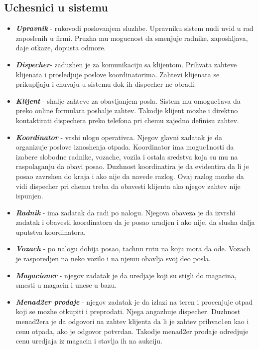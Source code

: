 \documentclass[10 pt]{article}
\begin{document}
	\subsection{Uchesnici u sistemu}
	
	\begin{itemize}
		
		\item\textbf{\textit{Upravnik}} - rukovodi poslovanjem sluzhbe. Upravniku sistem nudi uvid u rad zaposlenih u firmi. Pruzha mu mogucnost da smenjuje radnike, zaposhljava, daje otkaze, dopusta odmore.
		
		\item\textbf{\textit{Dispecher}}- zaduzhen je za komunikaciju sa klijentom. Prihvata zahteve klijenata i prosledjuje poslove koordinatorima. Zahtevi klijenata se prikupljaju i chuvaju u sistemu dok ih dispecher ne obradi.
		
		\item\textbf{\textit{Klijent}} - shalje zahteve za obavljanjem posla. Sistem mu omoguc1ava da preko online formulara poshalje zahtev. Takodje klijent mozhe i direktno kontaktirati dispechera preko telefona pri chemu zajedno definisu zahtev. 
		
		\item\textbf{\textit{Koordinator}} - vrshi ulogu operativca. Njegov glavni zadatak je da organizuje poslove iznoshenja otpada. Koordinator ima moguc1nosti da izabere slobodne radnike, vozache, vozila i ostala sredstva koja su mu na raspolaganju da obavi posao. Duzhnost koordinatira je da evidentira da li je posao zavrshen do kraja i ako nije da navede razlog. Ovaj razlog mozhe da vidi dispecher pri chemu treba da obavesti klijenta ako njegov zahtev nije ispunjen.
		
		\item\textbf{\textit{Radnik}} - ima zadatak da radi po nalogu. Njegova obaveza je da izvrshi zadatak i obavesti koordinatora da je posao uradjen i ako nije, da slusha dalja uputstva koordinatora.
		
		\item\textbf{\textit{Vozach}} - po nalogu dobija posao, tachnu rutu na koju mora da ode. Vozach je rasporedjen na neko vozilo i na njemu obavlja svoj deo posla.
		
		\item\textbf{\textit{Magacioner}} - njegov zadatak je da uredjaje koji su stigli do magacina, smesti u magacin i unese u bazu.
		
		\item\textbf{\textit{Menad2er prodaje}} - njegov zadatak je da izlazi na teren i procenjuje otpad koji se mozhe otkupiti i preprodati.
		Njega angazhuje dispecher. Duzhnost menad2era je da odgovori na zahtev klijenta da li je zahtev prihvac1en kao i cenu otpada, ako je odgovor potvrdan. Takodje menad2er prodaje odredjuje cenu uredjaja iz magacin i stavlja ih na aukciju.
	
	\end{itemize}	
	
\end{document}
